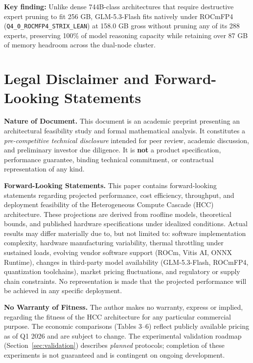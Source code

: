 \documentclass[11pt,a4paper]{article}
\begin{document}
\noindent \textbf{Key finding:} Unlike dense 744B-class architectures that require destructive expert pruning to fit 256 GB, GLM-5.3-Flash fits natively under ROCmFP4 (\texttt{Q4\_0\_ROCMFP4\_STRIX\_LEAN}) at 158.0 GB gross without pruning any of its 288 experts, preserving 100\% of model reasoning capacity while retaining over 87 GB of memory headroom across the dual-node cluster.

\section{Legal Disclaimer and Forward-Looking Statements}

\begin{tcolorbox}[colback=white, colframe=gray, boxrule=0.4pt, arc=2pt, left=8pt, right=8pt, top=6pt, bottom=6pt]
\small

\textbf{Nature of Document.} This document is an academic preprint presenting an architectural feasibility study and formal mathematical analysis. It constitutes a \textit{pre-competitive technical disclosure} intended for peer review, academic discussion, and preliminary investor due diligence. It is \textbf{not} a product specification, performance guarantee, binding technical commitment, or contractual representation of any kind.

\textbf{Forward-Looking Statements.} This paper contains forward-looking statements regarding projected performance, cost efficiency, throughput, and deployment feasibility of the Heterogeneous Compute Cascade (HCC) architecture. These projections are derived from roofline models, theoretical bounds, and published hardware specifications under idealized conditions. Actual results may differ materially due to, but not limited to: software implementation complexity, hardware manufacturing variability, thermal throttling under sustained loads, evolving vendor software support (ROCm, Vitis AI, ONNX Runtime), changes in third-party model availability (GLM-5.3-Flash, ROCmFP4, quantization toolchains), market pricing fluctuations, and regulatory or supply chain constraints. No representation is made that the projected performance will be achieved in any specific deployment.

\textbf{No Warranty of Fitness.} The author makes no warranty, express or implied, regarding the fitness of the HCC architecture for any particular commercial purpose. The economic comparisons (Tables 3--6) reflect publicly available pricing as of Q1 2026 and are subject to change. The experimental validation roadmap (Section~\ref{sec:validation}) describes \textit{planned} protocols; completion of these experiments is not guaranteed and is contingent on ongoing development.


\end{tcolorbox}
\end{document}
